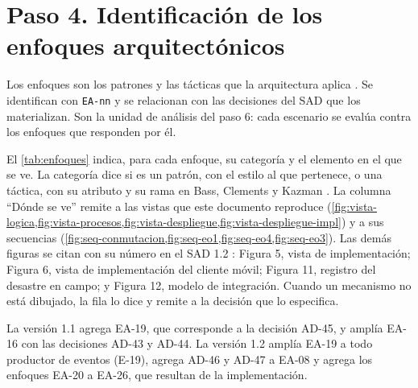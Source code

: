 \documentclass[11pt,letterpaper]{article}
\begin{document}
\section{Paso 4. Identificación de los enfoques arquitectónicos}
\label{sec:paso4}

Los enfoques son los patrones y las tácticas que la arquitectura aplica \cite{bass}. Se identifican con
\texttt{EA-nn} y se relacionan con las decisiones del SAD que los materializan. Son la unidad de
análisis del paso 6: cada escenario se evalúa contra los enfoques que responden por él.

El \cref{tab:enfoques} indica, para cada enfoque, su categoría y el elemento en el que se ve. La
categoría dice si es un patrón, con el estilo al que pertenece, o una táctica, con su atributo y su
rama en Bass, Clements y Kazman \cite{bass}. La columna \enquote{Dónde se ve} remite a las vistas que
este documento reproduce (\cref{fig:vista-logica,fig:vista-procesos,fig:vista-despliegue,fig:vista-despliegue-impl})
y a sus secuencias (\cref{fig:seq-conmutacion,fig:seq-eo1,fig:seq-eo4,fig:seq-eo3}). Las demás figuras
se citan con su número en el SAD 1.2 \cite{sad}: Figura 5, vista de implementación; Figura 6, vista de
implementación del cliente móvil; Figura 11, registro del desastre en campo; y Figura 12, modelo de
integración. Cuando un mecanismo no está dibujado, la fila lo dice y remite a la decisión que lo
especifica.

La versión 1.1 agrega EA-19, que corresponde a la decisión AD-45, y amplía EA-16 con las decisiones
AD-43 y AD-44. La versión 1.2 amplía EA-19 a todo productor de eventos (E-19), agrega AD-46 y AD-47 a
EA-08 y agrega los enfoques EA-20 a EA-26, que resultan de la implementación.
\end{document}
